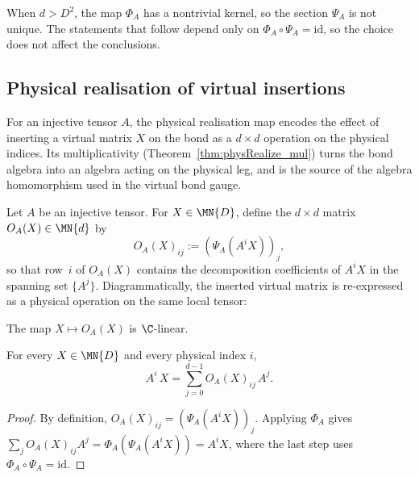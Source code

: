 \begin{remark}
    \label{rem:decomposition_nonunique}
    When $d > D^2$, the map $\Phi_A$ has a nontrivial kernel, so
    the section $\Psi_A$ is not unique.
    The statements that follow depend only on
    $\Phi_A \circ \Psi_A = \mathrm{id}$, so the choice does not
    affect the conclusions.
\end{remark}

\subsection{Physical realisation of virtual insertions}%
\label{sec:phys_realize}

For an injective tensor $A$, the physical realisation map encodes the
effect of inserting a virtual matrix $X$ on the bond as a $d \times d$
operation on the physical indices. Its multiplicativity
(Theorem~\ref{thm:physRealize_mul}) turns the bond algebra into an algebra
acting on the physical leg, and is the source of the algebra homomorphism
used in the virtual bond gauge.

\begin{definition}\label{def:phys_realize}
    \leanok
    Let $A$ be an injective tensor.
    For $X \in \MN{D}$, define the $d \times d$ matrix
    $O_A(X) \in \MN{d}$ by
    \[
        O_A(X)_{ij} := (\Psi_A(A^i X))_j,
    \]
    so that row~$i$ of $O_A(X)$ contains the decomposition coefficients
    of $A^i X$ in the spanning set $\{A^j\}$.
    Diagrammatically, the inserted virtual matrix is re-expressed as a
    physical operation on the same local tensor:
    \begin{center}
    \end{center}
    The map $X \mapsto O_A(X)$ is $\C$-linear.
\end{definition}

\begin{lemma}%
    \label{lem:physRealize_spec}
    \leanok
    For every $X \in \MN{D}$ and every physical index $i$,
    \[
        A^i\, X = \sum_{j=0}^{d-1} O_A(X)_{ij}\, A^j.
    \]
\end{lemma}

\begin{proof}
    \leanok
    By definition, $O_A(X)_{ij} = (\Psi_A(A^i X))_j$.
    Applying $\Phi_A$ gives
    $\sum_j O_A(X)_{ij} A^j = \Phi_A(\Psi_A(A^i X)) = A^i X$,
    where the last step uses $\Phi_A \circ \Psi_A = \mathrm{id}$.
\end{proof}

